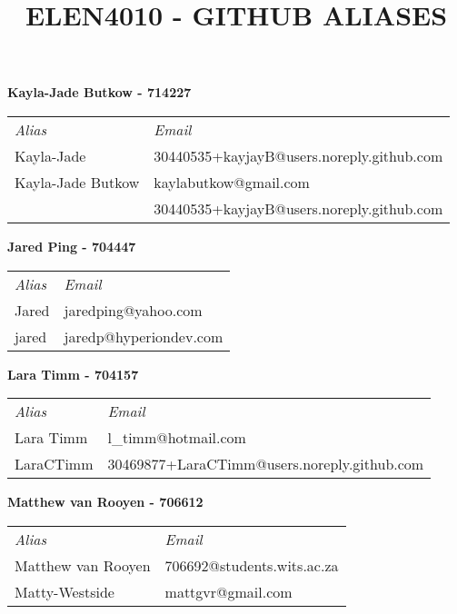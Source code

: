 \documentclass[10pt,onecolumn]{witseiepaper}
\title{ELEN4010 - GITHUB ALIASES}
\author{}
\begin{document}
\maketitle
\pagestyle{plain}
\setcounter{page}{1}


\textbf{Kayla-Jade Butkow - 714227}

\begin{tabular}{ll}
	\textit{Alias} & \textit{Email} \\[8pt]
	Kayla-Jade & 30440535+kayjayB@users.noreply.github.com \\[10pt] 
	Kayla-Jade Butkow & kaylabutkow@gmail.com \\[4pt]
	 & 30440535+kayjayB@users.noreply.github.com \\[10pt] 
\end{tabular} 
\vspace{3mm}

\textbf{Jared  Ping - 704447}

\begin{tabular}{ll}
	\textit{Alias} & \textit{Email} \\[8pt]
	Jared & 
	jaredping@yahoo.com \\[10pt] 
	jared & jaredp@hyperiondev.com \\[10pt] 
\end{tabular} 
\vspace{5mm}

\textbf{Lara Timm - 704157}

\begin{tabular}{ll}
	\textit{Alias} & \textit{Email} \\[8pt]
	Lara Timm & 
	l\_timm@hotmail.com \\[10pt] 
	LaraCTimm & 30469877+LaraCTimm@users.noreply.github.com \\[10pt] 
\end{tabular} 
\vspace{5mm}

\textbf{Matthew van  Rooyen - 706612}

\begin{tabular}{ll}
	\textit{Alias} & \textit{Email} \\[8pt]
	Matthew van Rooyen & 
	706692@students.wits.ac.za \\[10pt] 
	Matty-Westside & mattgvr@gmail.com \\[10pt] 
\end{tabular} 
\end{document}
